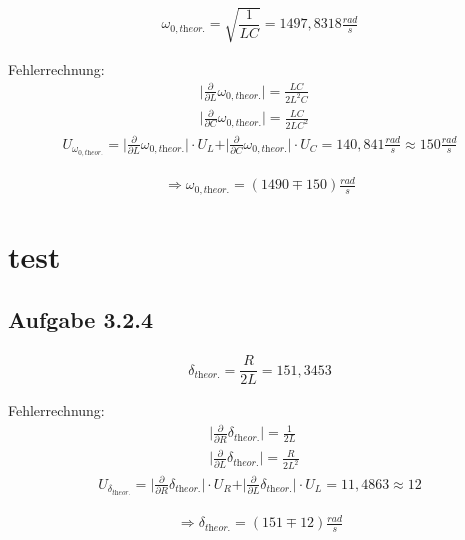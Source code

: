 \documentclass[a4paper]{scrartcl}
\numberwithin{equation}{subsection}
\begin{document}
\begin{align}
\omega_{0,\textit{theor.}} = \sqrt{\dfrac{1}{LC}}= 1497,8318 \frac{rad}{s}
\end{align}

Fehlerrechnung:
\begin{align*}
\vert \frac{\partial}{\partial L}\omega_{0,\textit{theor.}}\vert = \frac{LC}{2L^2C} &\\
\vert \frac{\partial}{\partial C}\omega_{0,\textit{theor.}}\vert = \frac{LC}{2LC^2} &
\end{align*}
\begin{align*}
U_{\omega_{0,\textit{theor.}}} = \vert \frac{\partial}{\partial L}\omega_{0,\textit{theor.}}\vert \cdot U_L + \vert \frac{\partial}{\partial C}\omega_{0,\textit{theor.}}\vert \cdot U_C = 140,841 \frac{rad}{s} \approx 150 \frac{rad}{s}
\end{align*}

\begin{align*}
\Rightarrow \omega_{0,\textit{theor.}} = (1490 \mp 150) \frac{rad}{s}
\end{align*}

\section{test}
\subsection{Aufgabe 3.2.4}

\begin{align}
\delta_{\textit{theor.}} = \dfrac{R}{2L}= 151,3453
\end{align}

Fehlerrechnung:
\begin{align*}
\vert \frac{\partial}{\partial R}\delta_{\textit{theor.}}\vert = \frac{1}{2L} &\\
\vert \frac{\partial}{\partial L}\delta_{\textit{theor.}}\vert = \frac{R}{2L^2} &
\end{align*}
\begin{align*}
U_{\delta_{\textit{theor.}}} = \vert \frac{\partial}{\partial R}\delta_{\textit{theor.}}\vert \cdot U_R + \vert \frac{\partial}{\partial L}\delta_{\textit{theor.}}\vert \cdot U_L = 11,4863 \approx 12 
\end{align*}

\begin{align*}
\Rightarrow \delta_{\textit{theor.}} = (151 \mp 12) \frac{rad}{s}
\end{align*}
\end{document}
